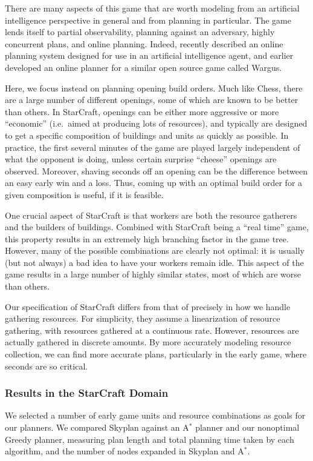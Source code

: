 \documentclass[letterpaper]{article}
\theoremstyle{plain} \newtheorem{theorem}{Theorem} \newtheorem{proposition}{Proposition} \newtheorem{lemma}{Lemma}
\theoremstyle{definition} \newtheorem{definition}{Definition} \newtheorem{conjecture}{Conjecture} \newtheorem*{example}{Example}
\theoremstyle{remark} \newtheorem*{remark}{Remark} \newtheorem*{note}{Note} \newtheorem{case}{Case}
\newcommand{\Astar}{A$^*$ }
\newcommand{\Astarpunct}{A$^*$}
\begin{document}
There are many aspects of this game that are worth modeling from
an artificial intelligence perspective in general and from planning
in particular. The game lends itself to partial observability,
planning against an adversary, highly concurrent plans, and online
planning.  Indeed, \citet{churchill11build} recently described an
online planning system designed for use in an artificial intelligence
agent, and \citet{chan07online} earlier developed an online planner
for a similar open source game called Wargus.

Here, we focus instead on planning opening build orders. Much like
Chess, there are a large number of different openings, some of which
are known to be better than others. In StarCraft, openings can be
either more aggressive or more ``economic'' (i.e.\ aimed at producing
lots of resources), and typically are designed to get a specific composition
of buildings and units as quickly as possible.  In practice, the
first several minutes of the game are played largely independent
of what the opponent is doing, unless certain surprise ``cheese''
openings are observed. Moreover, shaving seconds off an opening can
be the difference between an easy early win and a loss. Thus, coming
up with an optimal build order for a given composition is useful,
if it is feasible.

One crucial aspect of StarCraft is that workers are both the resource gatherers
and the builders of buildings. Combined with StarCraft being a ``real time'' game, 
this property results in an extremely high branching factor in the game tree. However,
many of the possible combinations are clearly not optimal: it is usually (but not always) a bad idea
to have your workers remain idle. This aspect of the game results in a large number of highly similar
states, most of which are worse than others.

Our specification of StarCraft differs from that of
\citet{churchill11build} precisely in how we handle gathering
resources. For simplicity, they assume a linearization of resource
gathering, with resources gathered at a continuous rate. However,
resources are actually gathered in discrete amounts. By more
accurately modeling resource collection, we can find more
accurate plans, particularly in the early game, where seconds
are so critical.

\subsubsection{Results in the StarCraft Domain}
We selected a number of early game units and resource combinations as goals for our planners.
We compared Skyplan against an \Astar planner and our
nonoptimal Greedy planner, measuring plan length and total planning time taken by each algorithm, and the number
of nodes expanded in Skyplan and \Astarpunct.
\end{document}
